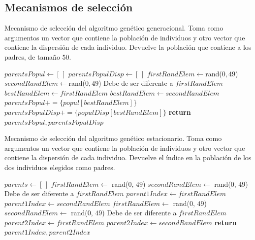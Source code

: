 \subsection{Mecanismos de selección}
\begin{algorithm}[H]
    \caption{Mecanismo de selección del algoritmo genético generacional. Toma como argumentos un vector que contiene la población de individuos y otro vector que contiene la dispersión de cada individuo. Devuelve la población que contiene a los padres, de tamaño 50.}
\begin{algorithmic}
    \State $parentsPopul \leftarrow [ \, ]$
    \State $parentsPopulDisp \leftarrow [ \, ]$
    \State
        \State $firstRandElem \leftarrow $rand($0,49$)
        \State $secondRandElem \leftarrow $rand($0,49$) \Comment Debe de ser diferente a $firstRandElem$
        \State
        \State $bestRandElem \leftarrow firstRandElem$
            \State $bestRandElem \leftarrow secondRandElem$
        \EndIf
        \State
        \State $parentsPopul += \{popul[bestRandElem]\}$
        \State $parentsPopulDisp += \{populDisp[bestRandElem]\}$
    \EndFor
    \State
    \State \textbf{return} $parentsPopul, parentsPopulDisp$
\EndProcedure
\end{algorithmic}
\end{algorithm}

\begin{algorithm}[H]
    \caption{Mecanismo de selección del algoritmo genético estacionario. Toma como argumentos un vector que contiene la población de individuos y otro vector que contiene la dispersión de cada individuo. Devuelve el índice en la población de los dos individuos elegidos como padres.}
\begin{algorithmic}
    \State $parents \leftarrow [ \, ]$
    \State 
    \State $firstRandElem \leftarrow$ rand($0$, $49$) 
    \State $secondRandElem \leftarrow$ rand($0$, $49$) \Comment Debe de ser diferente a $firstRandElem$
    \State $parent1Index \leftarrow firstRandElem$
        \State $parent1Index \leftarrow secondRandElem$
    \EndIf
    \State 
    \State $firstRandElem \leftarrow$ rand($0$, $49$) 
    \State $secondRandElem \leftarrow$ rand($0$, $49$) \Comment Debe de ser diferente a $firstRandElem$
    \State $parent2Index \leftarrow firstRandElem$
        \State $parent2Index \leftarrow secondRandElem$
    \EndIf
    \State
    \State \textbf{return} $parent1Index, parent2Index$
\EndProcedure
\end{algorithmic}
\end{algorithm}


